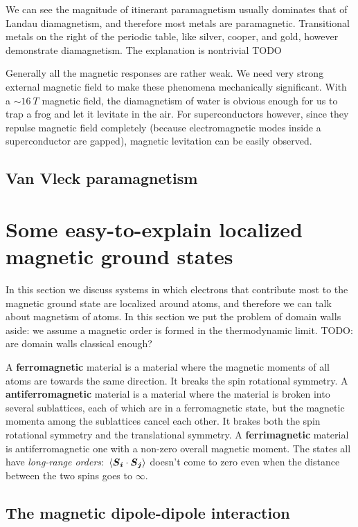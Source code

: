 \documentclass[hyperref, a4paper]{article}
\newcommand*{\concept}[1]{{\textbf{#1}}}
\begin{document}
We can see the magnitude of itinerant paramagnetism usually dominates that of Landau diamagnetism,
and therefore most metals are paramagnetic. 
Transitional metals on the right of the periodic table, like silver, cooper, and gold,
however demonstrate diamagnetism.
The explanation is nontrivial TODO

Generally all the magnetic responses are rather weak. 
We need very strong external magnetic field 
to make these phenomena mechanically significant.
With a $\sim \SI{16}{T}$ magnetic field,
the diamagnetism of water is obvious enough 
for us to trap a frog and let it levitate in the air.
For superconductors however, 
since they repulse magnetic field completely
(because electromagnetic modes inside a superconductor are gapped),
magnetic levitation can be easily observed.

\subsection{Van Vleck paramagnetism}

\section{Some easy-to-explain localized magnetic ground states}

In this section we discuss systems in which 
electrons that contribute most to the magnetic ground state 
are localized around atoms,
and therefore we can talk about magnetism of atoms.
In this section we put the problem of domain walls aside: 
we assume a magnetic order is formed in the thermodynamic limit. TODO: are domain walls classical enough?

A \concept{ferromagnetic} material is a material 
where the magnetic moments of all atoms are towards the same direction.
It breaks the spin rotational symmetry.
A \concept{antiferromagnetic} material is a material
where the material is broken into several sublattices,
each of which are in a ferromagnetic state,
but the magnetic momenta among the sublattices cancel each other.
It brakes both the spin rotational symmetry 
and the translational symmetry.
A \concept{ferrimagnetic} material is antiferromagnetic one with a non-zero overall magnetic moment.
The states all have \emph{long-range orders}:
$\expval*{\vb*{S}_{\vb*{i}} \cdot \vb*{S}_{\vb*{j}}}$ doesn't come to zero 
even when the distance between the two spins goes to $\infty$.

\subsection{The magnetic dipole-dipole interaction}
\end{document}

